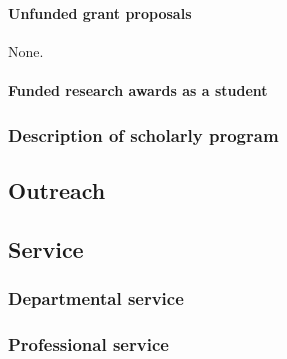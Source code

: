 \paragraph{Unfunded grant proposals}
None.

\paragraph{Funded research awards as a student}


\subsubsection{Description of scholarly program}


\subsection{Outreach}


\subsection{Service}

\subsubsection{Departmental service}


\subsubsection{Professional service}




